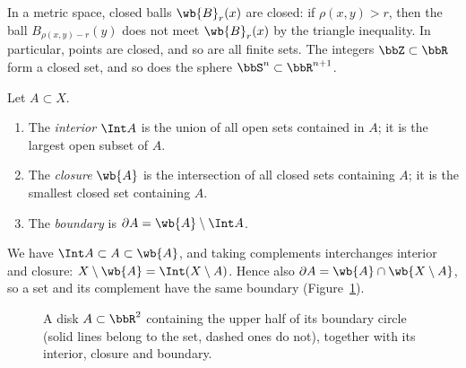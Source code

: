 \begin{example}
    In a metric space, closed balls $\wb{B}_r(x)$ are closed: if $\rho(x,y)>r$, then the ball $B_{\rho(x,y)-r}(y)$ does not meet $\wb{B}_r(x)$ by the triangle inequality. In particular, points are closed, and so are all finite sets. The integers $\bbZ\subset\bbR$ form a closed set, and so does the sphere $\bbS^n\subset\bbR^{n+1}$.
\end{example}

\begin{defn}
    Let $A\subset X$.
    \begin{enumerate}
        \item The \emph{interior} $\Int A$ is the union of all open sets contained in $A$; it is the largest open subset of $A$.
        \item The \emph{closure} $\wb{A}$ is the intersection of all closed sets containing $A$; it is the smallest closed set containing $A$.
        \item The \emph{boundary} is $\partial A=\wb{A}\setminus\Int A$.
    \end{enumerate}
\end{defn}

We have $\Int A\subset A\subset\wb{A}$, and taking complements interchanges interior and closure: $X\setminus\wb{A}=\Int(X\setminus A)$. Hence also $\partial A=\wb{A}\cap\wb{X\setminus A}$, so a set and its complement have the same boundary (Figure~\ref{fig int closure boundary}).

\begin{figure}[tp]
    \centering
    \caption{A disk $A\subset\bbR^2$ containing the upper half of its boundary circle (solid lines belong to the set, dashed ones do not), together with its interior, closure and boundary.}
    \label{fig int closure boundary}
\end{figure}


